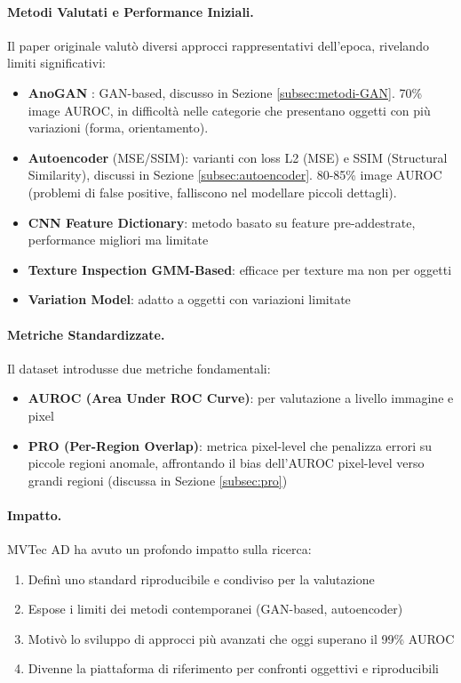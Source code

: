 \paragraph{Metodi Valutati e Performance Iniziali.} Il paper originale valutò diversi approcci rappresentativi dell'epoca, rivelando limiti significativi:
\begin{itemize}
    \item \textbf{AnoGAN} \cite{schlegl2017unsupervised}: GAN-based, discusso in Sezione \ref{subsec:metodi-GAN}. 70\% image AUROC, in difficoltà nelle categorie che presentano oggetti con più variazioni (forma, orientamento).
    \item \textbf{Autoencoder} (MSE/SSIM): varianti con loss L2 (MSE) e SSIM (Structural Similarity), discussi in Sezione \ref{subsec:autoencoder}. 80-85\% image AUROC (pro\-ble\-mi di false positive, falliscono nel modellare piccoli dettagli).
    \item \textbf{CNN Feature Dictionary}: metodo basato su feature pre-addestrate, performance migliori ma limitate
    \item \textbf{Texture Inspection GMM-Based}: efficace per texture ma non per oggetti
    \item \textbf{Variation Model}: adatto a oggetti con variazioni limitate
\end{itemize}

\paragraph{Metriche Standardizzate.} Il dataset introdusse due metriche fondamentali:
\begin{itemize}
    \item \textbf{AUROC (Area Under ROC Curve)}: per valutazione a livello im\-ma\-gi\-ne e pixel
    \item \textbf{PRO (Per-Region Overlap)}: metrica pixel-level che penalizza errori su piccole regioni anomale, affrontando il bias dell'AUROC pixel-level verso grandi regioni (discussa in Sezione \ref{subsec:pro})
\end{itemize} 

\paragraph{Impatto.} MVTec AD ha avuto un profondo impatto sulla ricerca:
\begin{enumerate}
    \item Definì uno standard riproducibile e condiviso per la valutazione
    \item Espose i limiti dei metodi contemporanei (GAN-based, autoencoder)
    \item Motivò lo sviluppo di approcci più avanzati che oggi superano il 99\% AUROC
    \item Divenne la piattaforma di riferimento per confronti oggettivi e riproducibili
\end{enumerate}

